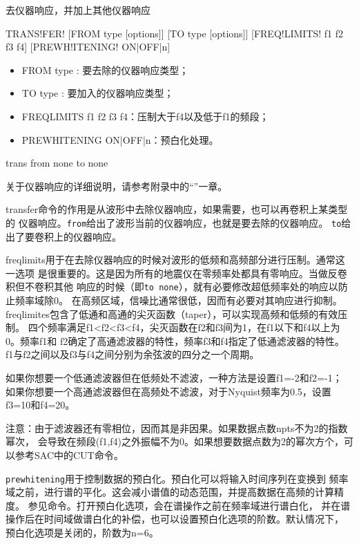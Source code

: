\label{cmd:transfer}

去仪器响应，并加上其他仪器响应

\begin{SACSTX}
TRANS!FER! [FROM type [options]] [TO type [options]]
    [FREQ!LIMITS! f1 f2 f3 f4] [PREWH!ITENING! ON|OFF|n]
\end{SACSTX}

\begin{itemize}
\item FROM type : 要去除的仪器响应类型；
\item TO type : 要加入的仪器响应类型；
\item FREQLIMITS f1 f2 f3 f4：压制大于f4以及低于f1的频段；
\item PREWHITENING ON|OFF|n：预白化处理。
\end{itemize}

\begin{SACDFT}
trans from none to none
\end{SACDFT}

关于仪器响应的详细说明，请参考附录中的``''一章。

transfer命令的作用是从波形中去除仪器响应，如果需要，也可以再卷积上某类型的
仪器响应。\verb+from+给出了波形当前的仪器响应，也就是要去除的仪器响应。
\verb+to+给出了要卷积上的仪器响应。

freqlimits用于在去除仪器响应的时候对波形的低频和高频部分进行压制。通常这一选项
是很重要的。这是因为所有的地震仪在零频率处都具有零响应。当做反卷积但不卷积其他
响应的时候（即\verb+to none+），就有必要修改超低频率处的响应以防止频率域除0。
在高频区域，信噪比通常很低，因而有必要对其响应进行抑制。
freqlimites包含了低通和高通的尖灭函数（taper），可以实现高频和低频的有效压制。
四个频率满足f1<f2<f3<f4，尖灭函数在f2和f3间为1，在f1以下和f4以上为0。频率f1和
f2确定了高通滤波器的特性，频率f3和f4指定了低通滤波器的特性。
f1与f2之间以及f3与f4之间分别为余弦波的四分之一个周期。

如果你想要一个低通滤波器但在低频处不滤波，一种方法是设置f1=-2和f2=-1；
如果你想要一个高通滤波器但在高频处不滤波，对于Nyquist频率为0.5，设置f3=10和f4=20。

注意：由于滤波器还有零相位，因而其是非因果。如果数据点数npts不为2的指数幂次，
会导致在频段(f1,f4)之外振幅不为0。如果想要数据点数为2的幂次方个，可以参考SAC中的CUT命令。

\verb+prewhitening+用于控制数据的预白化。预白化可以将输入时间序列在变换到
频率域之前，进行谱的平化。这会减小谱值的动态范围，并提高数据在高频的计算精度。
参见命令。打开预白化选项，会在谱操作之前在频率域进行谱白化，
并在谱操作后在时间域做谱白化的补偿，也可以设置预白化选项的阶数。默认情况下，
预白化选项是关闭的，阶数为n=6。

